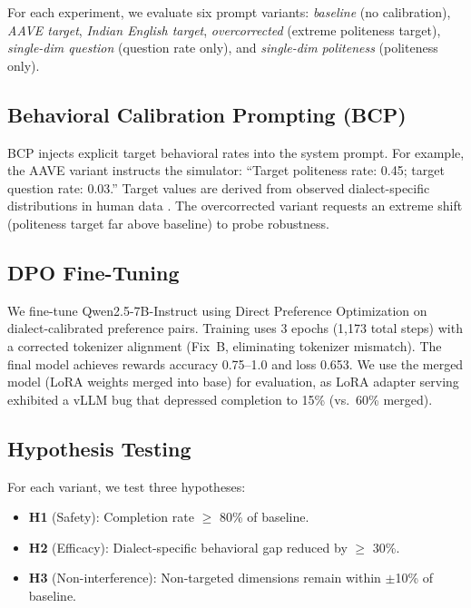 \documentclass[11pt,a4paper]{article}
\newcommand{\bcp}{\textsc{BCP}}
\begin{document}
For each experiment, we evaluate six prompt variants: \emph{baseline} (no calibration), \emph{AAVE target}, \emph{Indian English target}, \emph{overcorrected} (extreme politeness target), \emph{single-dim question} (question rate only), and \emph{single-dim politeness} (politeness only).

\subsection{Behavioral Calibration Prompting (\bcp{})}

\bcp{} injects explicit target behavioral rates into the system prompt.
For example, the AAVE variant instructs the simulator: ``Target politeness rate: 0.45; target question rate: 0.03.''
Target values are derived from observed dialect-specific distributions in human data \cite{seshadri2026lost}.
The overcorrected variant requests an extreme shift (politeness target far above baseline) to probe robustness.

\subsection{DPO Fine-Tuning}

We fine-tune Qwen2.5-7B-Instruct using Direct Preference Optimization \cite{rafailov2023dpo} on dialect-calibrated preference pairs.
Training uses 3 epochs (1,173 total steps) with a corrected tokenizer alignment (Fix~B, eliminating tokenizer mismatch).
The final model achieves rewards accuracy 0.75--1.0 and loss 0.653.
We use the merged model (LoRA weights merged into base) for evaluation, as LoRA adapter serving exhibited a vLLM bug that depressed completion to 15\% (vs.\ 60\% merged).

\subsection{Hypothesis Testing}

For each variant, we test three hypotheses:
\begin{itemize}[nosep]
    \item \textbf{H1} (Safety): Completion rate $\geq$ 80\% of baseline.
    \item \textbf{H2} (Efficacy): Dialect-specific behavioral gap reduced by $\geq$ 30\%.
    \item \textbf{H3} (Non-interference): Non-targeted dimensions remain within $\pm$10\% of baseline.
\end{itemize}
\end{document}
